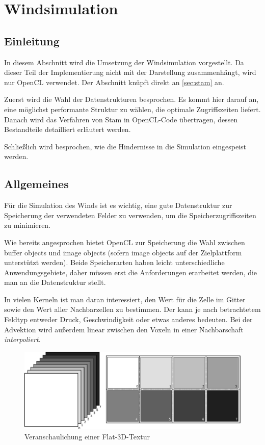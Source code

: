 \section{Windsimulation}
\label{sec:implementation_wind}

\subsection{Einleitung}

In diesem Abschnitt wird die Umsetzung der Windsimulation
vorgestellt. Da dieser Teil der Implementierung nicht mit der
Darstellung zusammenhängt, wird nur OpenCL verwendet. Der Abschnitt
knüpft direkt an \cref{sec:stam} an.

Zuerst wird die Wahl der Datenstrukturen besprochen. Es kommt hier
darauf an, eine möglichst performante Struktur zu wählen, die optimale
Zugriffszeiten liefert. Danach wird das Verfahren von Stam in
OpenCL-Code übertragen, dessen Bestandteile detailliert erläutert
werden.

Schließlich wird besprochen, wie die Hindernisse in die
Simulation eingespeist werden.

\subsection{Allgemeines}

Für die Simulation des Winds ist es wichtig, eine gute Datenstruktur
zur Speicherung der verwendeten Felder zu verwenden, um die
Speicherzugriffszeiten zu minimieren.

Wie bereits angesprochen bietet OpenCL zur Speicherung die Wahl
zwischen buffer objects und image objects (sofern image objects auf der
Zielplattform unterstützt werden). Beide Speicherarten haben leicht
unterschiedliche Anwendungsgebiete, daher müssen erst die
Anforderungen erarbeitet werden, die man an die Datenstruktur
stellt.

In vielen Kerneln ist man daran interessiert, den Wert für die
 Zelle im Gitter sowie den Wert aller
Nachbarzellen zu bestimmen. Der  kann je nach
betrachtetem Feldtyp entweder Druck, Geschwindigkeit oder etwas
anderes bedeuten. Bei der Advektion wird außerdem linear zwischen den
Voxeln in einer Nachbarschaft \emph{interpoliert}.

\begin{figure}[h]
\centering
\includegraphics[width=14cm]{images/flat_texture}
\caption{Veranschaulichung einer Flat-3D-Textur}
\label{fig:implementation_flat_3d_texture}
\end{figure}

